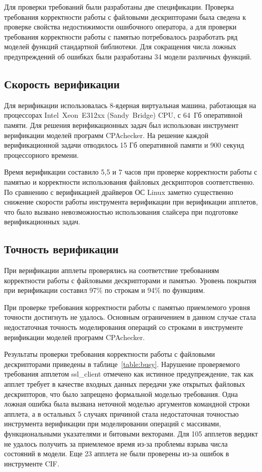 Для проверки требований были разработаны две спецификации.
Проверка требования корректности работы с файловыми дескрипторами была сведена к проверке свойства недостижимости ошибочного оператора, а для проверки требования корректности работы с памятью потребовалось разработать ряд моделей функций стандартной библиотеки. 
Для сокращения числа ложных предупреждений об ошибках были разработаны 34 модели различных функций.

\subsection{Скорость верификации}
Для верификации использовалась 8-ядерная виртуальная машина, работающая на процессорах \mbox{Intel Xeon E312xx} (Sandy~Bridge) CPU, с 64~Гб оперативной памяти.
Для решения верификационных задач был использован инструмент верификации моделей программ CPAchecker.
На решение каждой верификационной задачи отводилось 15 Гб оперативной памяти и 900 секунд процессорного времени.

Время верификации составило 5,5 и 7 часов при проверке корректности работы с памятью и корректности использования файловых дескрипторов соответственно.
По сравнению с верификацией драйверов ОС Linux заметно существенно снижение скорости работы инструмента верификации при верификации апплетов, что было вызвано невозможностью использования слайсера при подготовке верификационных задач.

\subsection{Точность верификации}
При верификации апплеты проверялись на соответствие требованиям корректности работы с файловыми дескрипторами и памятью.
Уровень покрытия при верификации составил 97\% по строкам и 94\% по функциям.

При проверке требования корректности работы с памятью приемлемого уровня точности достигнуть не удалось.
Основным ограничением в данном случае стала недостаточная точность моделирования операций со строками в инструменте верификации моделей программ CPAchecker.

Результаты проверки требования корректности работы с файловыми дескрипторами приведены в таблице~\ref{table:busy}.
Нарушение проверяемого требования апплетом ssl\_client отмечено как истинное предупреждение, так как апплет требует в качестве входных данных передачи уже открытых файловых дескрипторов, что было запрещено формальной моделью требования.
Одна ложная ошибка была вызвана неточной моделью аргументов командной строки апплета, а в остальных 5 случаях причиной стала недостаточная точностью инструмента верификации при моделировании операций с массивами, функциональными указателями и битовыми векторами.
Для 105 апплетов вердикт не удалось получить за приемлемое время из-за проблемы взрыва числа состояний в модели. 
Еще 23 апплета не были проверены из-за ошибок в инструменте CIF.

